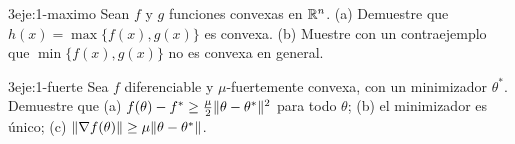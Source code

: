 \begin{ejercicio}{3}{eje:1-maximo}
Sean $f$ y $g$ funciones convexas en $\mathbb{R}^{n}$. (a) Demuestre que $h(x)=\max\{f(x),g(x)\}$ es convexa. (b) Muestre con un contraejemplo que $\min\{f(x),g(x)\}$ no es convexa en general.
\end{ejercicio}

\begin{ejercicio}{3}{eje:1-fuerte}
Sea $f$ diferenciable y $\mu$-fuertemente convexa, con un minimizador $\theta^{\ast}$. Demuestre que (a) $f(\theta)-f^{\ast}\ge\frac{\mu}{2}\lVert\theta-\theta^{\ast}\rVert^{2}$ para todo $\theta$; (b) el minimizador es único; (c) $\lVert\nabla f(\theta)\rVert\ge\mu\lVert\theta-\theta^{\ast}\rVert$.
\end{ejercicio}
